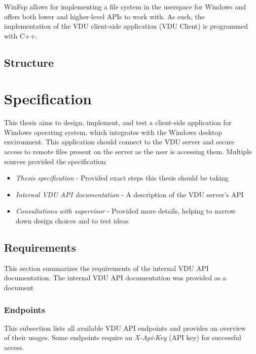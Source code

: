 WinFsp\cite{WinFsp} allows for implementing a file system in the userspace for Windows and offers both lower and higher-level APIs to work with. As such, the implementation of the VDU client-side application (VDU Client) is programmed with C++. 

\section{Structure}


\chapter{Specification}
\label{ch_specification}
This thesis aims to design, implement, and test a client-side application for Windows operating system, which integrates with the Windows desktop environment. This application should connect to the VDU server and secure access to remote files present on the server as the user is accessing them. Multiple sources provided the specification:
\begin{itemize}
    \item \textit{Thesis specification} - Provided exact steps this thesis should be taking
    \item \textit{Internal VDU API documentation} - A description of the VDU server's API
    \item \textit{Consultations with supervisor} - Provided more details, helping to narrow down design choices and to test ideas
\end{itemize}

\section{Requirements}
This section summarizes the requirements of the internal VDU API documentation. The internal VDU API documentation was provided as a document

\subsection{Endpoints}
This subsection lists all available VDU API endpoints and provides an overview of their usages. Some endpoints require an \textit{X-Api-Key} (API key) for successful access.

